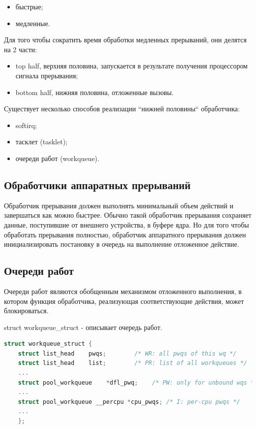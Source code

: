 \begin{itemize}
	\item быстрые;
	\item медленные. 
\end{itemize}

Для того чтобы сократить время обработки медленных прерываний, они делятся на 2 части:

\begin{itemize}
	\item top half, верхняя половина, запускается в результате получения процессором сигнала прерывания;
	\item bottom half, нижняя половина, отложенные вызовы.
\end{itemize}

Существует несколько способов реализации “нижней половины“
обработчика: 
\begin{itemize}
	\item softirq;
	\item тасклет (tasklet);
	\item очереди работ (workqueue).
\end{itemize}
\subsection{Обработчики аппаратных прерываний}



Обработчик прерывания должен выполнять минимальный объем действий и завершаться как можно быстрее.
Обычно такой обработчик прерывания сохраняет данные, поступившие от внешнего устройства, в буфере ядра. 
Но для того чтобы обработать прерывания полностью, обработчик аппаратного прерывания должен 
инициализировать постановку в очередь на выполнение отложенное действие.

\subsection{Очереди работ}

Очереди работ являются обобщенным механизмом отложенного выполнения, в котором 
функция обработчика, реализующая соответствующие действия, может блокироваться.

struct workqueue\_struct - описывает очередь работ.

\begin{lstlisting}[language=c, label=some-code, caption=Структура workqueue\_struct]
struct workqueue_struct {
	struct list_head    pwqs;        /* WR: all pwqs of this wq */
	struct list_head    list;        /* PR: list of all workqueues */
	...
	struct pool_workqueue    *dfl_pwq;    /* PW: only for unbound wqs */
	...
	struct pool_workqueue __percpu *cpu_pwqs; /* I: per-cpu pwqs */
	...
	};
\end{lstlisting}

